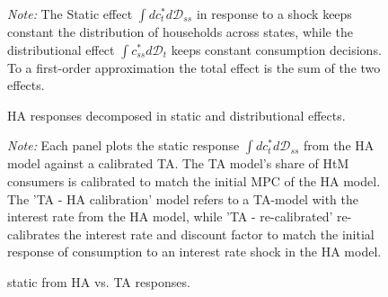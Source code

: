 \begin{figure}[H]
\caption{HA responses decomposed in static and distributional effects. }
\label{fig:C_decomp_over_dist}
 \scriptsize  
 \emph{Note:} The Static effect $\int dc_{t}^{*}d\mathcal{D}_{ss}$ in response to a shock keeps constant the distribution of households across states, while the distributional effect $\int c_{ss}^{*}d\mathcal{D}_{t}$ keeps constant consumption decisions. To a first-order approximation the total effect is the sum of the two effects. 
\end{figure}

\begin{figure}[h]
\caption{static from HA vs. TA responses.}
\label{fig:HANK_vs_TANK}
    \scriptsize
    {
    \emph{Note:} Each panel plots the static response $\int dc_{t}^{*}d\mathcal{D}_{ss}$ from the HA model against a calibrated TA. The TA model's share of HtM consumers is calibrated to match the initial MPC of the HA model. The 'TA - HA calibration' model refers to a TA-model with the interest rate from the HA model, while 'TA - re-calibrated' re-calibrates the interest rate and discount factor to match the initial response of consumption to an interest rate shock in the HA model.}
\end{figure}


